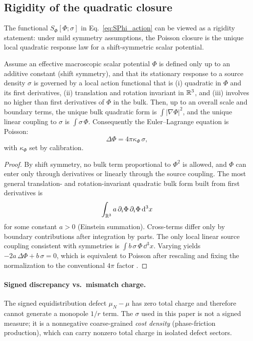 \subsection{Rigidity of the quadratic closure}

The functional $S_\Phi[\Phi;\sigma]$ in Eq.~\eqref{eq:SPhi_action} can be viewed as a rigidity statement: under mild symmetry assumptions, the Poisson closure is the unique local quadratic response law for a shift-symmetric scalar potential.

\begin{proposition}
\label{prop:poisson_rigidity}
Assume an effective macroscopic scalar potential $\Phi$ is defined only up to an additive constant (shift symmetry), and that its stationary response to a source density $\sigma$ is governed by a local action functional that is (i) quadratic in $\Phi$ and its first derivatives, (ii) translation and rotation invariant in $\mathbb{R}^3$, and (iii) involves no higher than first derivatives of $\Phi$ in the bulk. Then, up to an overall scale and boundary terms, the unique bulk quadratic form is $\int |\nabla\Phi|^2$, and the unique linear coupling to $\sigma$ is $\int \sigma\,\Phi$. Consequently the Euler--Lagrange equation is Poisson:
\begin{equation}
  \Delta\Phi = 4\pi\kappa_\Phi\,\sigma,
\end{equation}
with $\kappa_\Phi$ set by calibration.
\end{proposition}
\begin{proof}
By shift symmetry, no bulk term proportional to $\Phi^2$ is allowed, and $\Phi$ can enter only through derivatives or linearly through the source coupling. The most general translation- and rotation-invariant quadratic bulk form built from first derivatives is
\[
  \int_{\mathbb{R}^3} a\,\partial_i\Phi\,\partial_i\Phi\,\mathrm{d}^3x
\]
for some constant $a>0$ (Einstein summation). Cross-terms differ only by boundary contributions after integration by parts. The only local linear source coupling consistent with symmetries is $\int b\,\sigma\,\Phi\,\dd^3x$. Varying yields $-2a\,\Delta\Phi + b\,\sigma=0$, which is equivalent to Poisson after rescaling and fixing the normalization to the conventional $4\pi$ factor \cite{Jackson1998}.
\end{proof}

\paragraph{Signed discrepancy vs.\ mismatch charge.}
The signed equidistribution defect $\mu_N-\mu$ has zero total charge and therefore cannot generate a monopole $1/r$ term. The $\sigma$ used in this paper is not a signed measure; it is a nonnegative coarse-grained \emph{cost density} (phase-friction production), which can carry nonzero total charge in isolated defect sectors.

